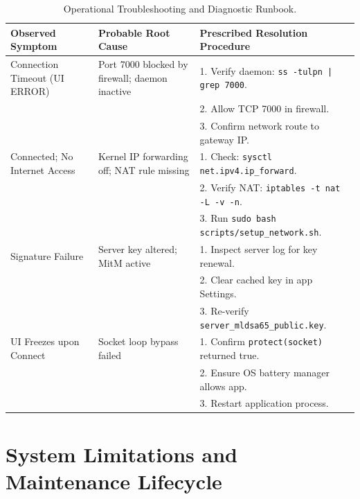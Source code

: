 \begin{table}[htbp]
  \centering
  \scriptsize
  \setlength{\tabcolsep}{3pt}
  \caption{Operational Troubleshooting and Diagnostic Runbook.}
  \label{tab:troubleshooting_guide}
  \begin{tabularx}{\linewidth}{@{}p{3.2cm}p{3.8cm}Y@{}}
    \toprule
    \textbf{Observed Symptom} & \textbf{Probable Root Cause} & \textbf{Prescribed Resolution Procedure} \\
    \midrule
    Connection Timeout (UI ERROR) & Port 7000 blocked by firewall; daemon inactive & 1. Verify daemon: \texttt{ss -tulpn | grep 7000}.\\ & & 2. Allow TCP 7000 in firewall.\\ & & 3. Confirm network route to gateway IP. \\
    Connected; No Internet Access & Kernel IP forwarding off; NAT rule missing & 1. Check: \texttt{sysctl net.ipv4.ip\_forward}.\\ & & 2. Verify NAT: \texttt{iptables -t nat -L -v -n}.\\ & & 3. Run \texttt{sudo bash scripts/setup\_network.sh}. \\
    Signature Failure & Server key altered; MitM active & 1. Inspect server log for key renewal.\\ & & 2. Clear cached key in app Settings.\\ & & 3. Re-verify \texttt{server\_mldsa65\_public.key}. \\
    UI Freezes upon Connect & Socket loop bypass failed & 1. Confirm \texttt{protect(socket)} returned true.\\ & & 2. Ensure OS battery manager allows app.\\ & & 3. Restart application process. \\
    \bottomrule
  \end{tabularx}
\end{table}

\section{System Limitations and Maintenance Lifecycle}
\label{sec:system_limitations}

